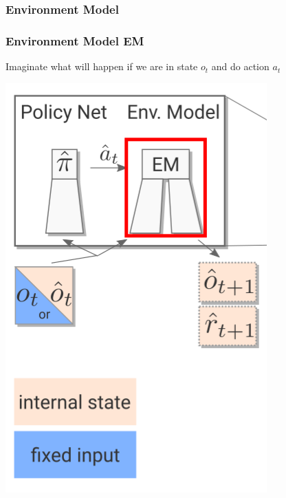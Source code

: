 \PraesentationMasterWeissBlau 
\begin{frame} 
    \frametitle{Environment Model}
\end{frame}

\PraesentationMasterStandard

\begin{frame}
    \frametitle{Environment Model EM}

\begin{multicols}{2}
	\begin{PraesentationAufzaehlung}
		\item Imaginate what will happen if we are in state $o_t$ and do action $a_t$
	\end{PraesentationAufzaehlung}
    \vfill\columnbreak
	\begin{center}
    \includegraphics[height=0.5\textheight]{./Images/environment_model.png}%
	\end{center}
\end{multicols}
    
\end{frame}
\clearpage


